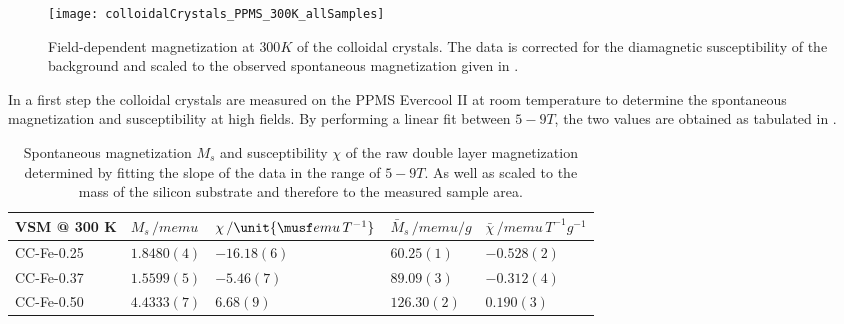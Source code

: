 \documentclass[\main/dresen_thesis.tex]{subfiles}
\begin{document}
  \label{sec:colloidalCrystals:vsm}

  \begin{figure}[tb]
    \centering
    \texttt{[image: colloidalCrystals\_PPMS\_300K\_allSamples]}
    \caption{\label{fig:colloidalCrystals:RTVSM}Field-dependent magnetization at $300 \unit{K}$ of the colloidal crystals. The data is corrected for the diamagnetic susceptibility of the background and scaled to the observed spontaneous magnetization given in .}
  \end{figure}

    In a first step the colloidal crystals are measured on the PPMS Evercool II at room temperature to determine the spontaneous magnetization and susceptibility at high fields.
    By performing a linear fit between $5 - 9 \unit{T}$, the two values are obtained as tabulated in .

    \begin{table}[!htbp]
      \centering
      \caption{\label{tab:colloidalCrystals:RTVSM:parameters} Spontaneous magnetization $M_s$ and susceptibility $\chi$ of the raw double layer magnetization determined by fitting the slope of the data in the range of $5 - 9 \unit{T}$. As well as scaled to the mass of the silicon substrate and therefore to the measured sample area.}
      \begin{tabular}{ l | l | l || l | l}
        \rule{0pt}{2ex} \textbf{VSM @ 300 K}
        & $M_s \, / \unit{memu}$
        & $\chi \, / \unit{\musf emu \, T ^{-1}}$
        & $\bar{M}_s \, / \unit{memu / g}$
        & $\bar{\chi} \, / \unit{memu \, T ^{-1} g^{-1}}$ \\
        \hline
        \rule{0pt}{2ex} CC-Fe-0.25    & $1.8480(4)$   & $-16.18(6)$ & $60.25(1)$  & $-0.528(2)$\\
        \rule{0pt}{2ex} CC-Fe-0.37    & $1.5599(5)$   & $-5.46(7)$  & $89.09(3)$  & $-0.312(4)$\\
        \rule{0pt}{2ex} CC-Fe-0.50    & $4.4333(7)$   & $6.68(9)$   & $126.30(2)$ & $0.190(3)$\\
        \hline
      \end{tabular}
    \end{table}
\end{document}
